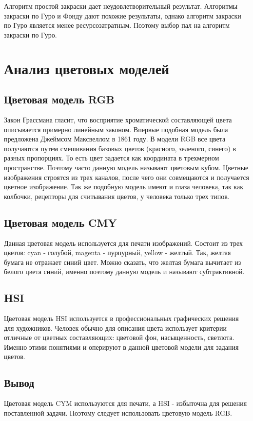       Алгоритм простой закраски дает неудовлетворительный результат. Алгоритмы закраски по Гуро и Фонду дают похожие результаты, однако алгоритм закраски по Гуро является менее ресурсозатратным. Поэтому выбор пал на алгоритм закраски по Гуро.

  \section{Анализ цветовых моделей}
 
    \subsection{Цветовая модель RGB}
    
      Закон Грассмана гласит, что восприятие хроматической составляющей цвета описывается примерно линейным законом. Впервые подобная модель была предложена Джеймсом Максвеллом в 1861 году. В модели RGB все цвета получаются путем смешивания базовых цветов (красного, зеленого, синего) в разных пропорциях. То есть цвет задается как координата в трехмерном пространстве. Поэтому часто данную модель называют цветовым кубом. Цветные изображения строятся из трех каналов, после чего они совмещаются и получается цветное изображение. Так же подобную модель имеют и глаза человека, так как колбочки, рецепторы для считывания цветов, у человека только трех типов.
    
    \subsection{Цветовая модель CMY}
    
      Данная цветовая модель используется для печати изображений. Состоит из трех цветов: cyan - голубой, magenta - пурпурный, yellow - желтый. Так, желтая бумага не отражает синий цвет. Можно сказать, что желтая бумага вычитает из белого цвета синий, именно поэтому данную модель и называют субтрактивной.

    
    \subsection{HSI}
    
      Цветовая модель HSI используется в профессиональных графических решения для художников. Человек обычно для описания цвета использует критерии отличные от цветных составляющих: цветовой фон, насыщенность, светлота. Именно этими понятиями и оперируют в данной цветовой модели для задания цветов.
    
    \subsection{Вывод}
    
      Цветовая модель CYM используются для печати, а HSI - избыточна для решения поставленной задачи. Поэтому следует использовать цветовую модель RGB.
